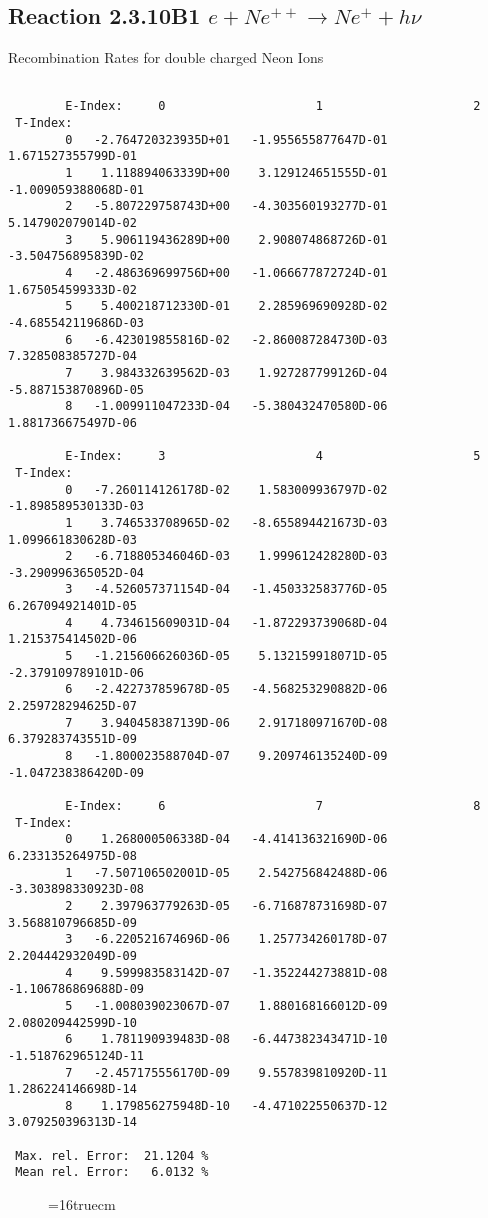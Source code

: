\documentclass[12pt]{article}
\begin{document}
\subsection{
Reaction 2.3.10B1   $e + Ne^{++}\rightarrow  Ne^+ + h\nu$
}


 Recombination Rates for double
 charged Neon Ions

\begin{small}\begin{verbatim}

        E-Index:     0                     1                     2
 T-Index:
        0   -2.764720323935D+01   -1.955655877647D-01    1.671527355799D-01
        1    1.118894063339D+00    3.129124651555D-01   -1.009059388068D-01
        2   -5.807229758743D+00   -4.303560193277D-01    5.147902079014D-02
        3    5.906119436289D+00    2.908074868726D-01   -3.504756895839D-02
        4   -2.486369699756D+00   -1.066677872724D-01    1.675054599333D-02
        5    5.400218712330D-01    2.285969690928D-02   -4.685542119686D-03
        6   -6.423019855816D-02   -2.860087284730D-03    7.328508385727D-04
        7    3.984332639562D-03    1.927287799126D-04   -5.887153870896D-05
        8   -1.009911047233D-04   -5.380432470580D-06    1.881736675497D-06

        E-Index:     3                     4                     5
 T-Index:
        0   -7.260114126178D-02    1.583009936797D-02   -1.898589530133D-03
        1    3.746533708965D-02   -8.655894421673D-03    1.099661830628D-03
        2   -6.718805346046D-03    1.999612428280D-03   -3.290996365052D-04
        3   -4.526057371154D-04   -1.450332583776D-05    6.267094921401D-05
        4    4.734615609031D-04   -1.872293739068D-04    1.215375414502D-06
        5   -1.215606626036D-05    5.132159918071D-05   -2.379109789101D-06
        6   -2.422737859678D-05   -4.568253290882D-06    2.259728294625D-07
        7    3.940458387139D-06    2.917180971670D-08    6.379283743551D-09
        8   -1.800023588704D-07    9.209746135240D-09   -1.047238386420D-09

        E-Index:     6                     7                     8
 T-Index:
        0    1.268000506338D-04   -4.414136321690D-06    6.233135264975D-08
        1   -7.507106502001D-05    2.542756842488D-06   -3.303898330923D-08
        2    2.397963779263D-05   -6.716878731698D-07    3.568810796685D-09
        3   -6.220521674696D-06    1.257734260178D-07    2.204442932049D-09
        4    9.599983583142D-07   -1.352244273881D-08   -1.106786869688D-09
        5   -1.008039023067D-07    1.880168166012D-09    2.080209442599D-10
        6    1.781190939483D-08   -6.447382343471D-10   -1.518762965124D-11
        7   -2.457175556170D-09    9.557839810920D-11    1.286224146698D-14
        8    1.179856275948D-10   -4.471022550637D-12    3.079250396313D-14

 Max. rel. Error:  21.1204 %
 Mean rel. Error:   6.0132 %

\end{verbatim}\end{small}
\begin{figure} \label{2.3.10B1}
\epsfxsize=16truecm
\end{figure}
\newpage
\end{document}
